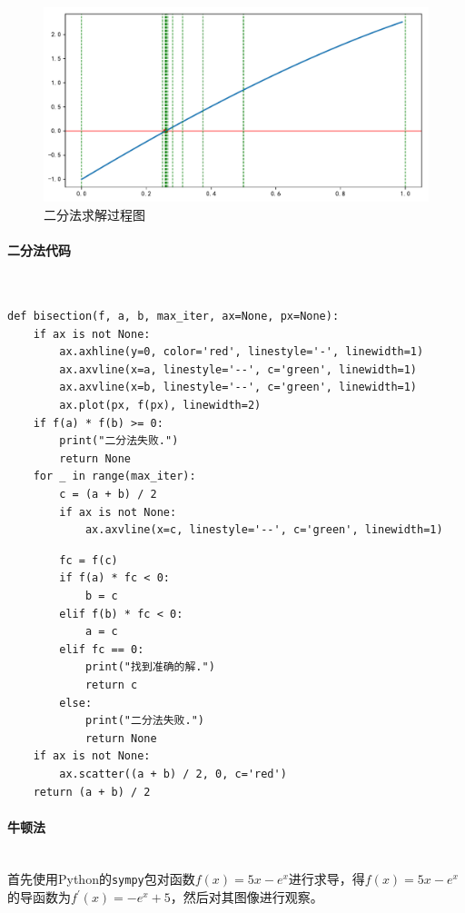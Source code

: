 \begin{figure}[H]
	\centering
	\caption{二分法求解过程图}
	\includegraphics[width=\linewidth]{fig9.pdf}
\end{figure}

\paragraph{二分法代码}
~\\
\begin{verbatim}
def bisection(f, a, b, max_iter, ax=None, px=None):
    if ax is not None:
        ax.axhline(y=0, color='red', linestyle='-', linewidth=1)
        ax.axvline(x=a, linestyle='--', c='green', linewidth=1)
        ax.axvline(x=b, linestyle='--', c='green', linewidth=1)
        ax.plot(px, f(px), linewidth=2)
    if f(a) * f(b) >= 0:
        print("二分法失败.")
        return None
    for _ in range(max_iter):
        c = (a + b) / 2
        if ax is not None:
            ax.axvline(x=c, linestyle='--', c='green', linewidth=1)
\end{verbatim}
\begin{verbatim}
        fc = f(c)
        if f(a) * fc < 0:
            b = c
        elif f(b) * fc < 0:
            a = c
        elif fc == 0:
            print("找到准确的解.")
            return c
        else:
            print("二分法失败.")
            return None
    if ax is not None:
        ax.scatter((a + b) / 2, 0, c='red')
    return (a + b) / 2
\end{verbatim}

\paragraph{牛顿法}
~\\
首先使用Python的\texttt{sympy}包对函数$f\left(x\right) = 5x - e^x$进行求导，得$f(x) = 5 x - e^{x}$的导函数为$ f^\prime(x) = - e^{x} + 5$，然后对其图像进行观察。

